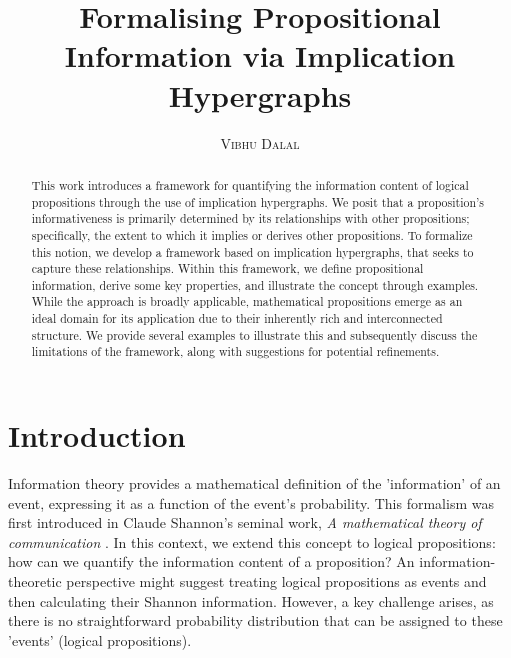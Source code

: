 \documentclass[11pt]{article}
\title{\textbf{Formalising Propositional Information via Implication Hypergraphs}}
\author{
    \textsc{Vibhu Dalal} \\[0.6em]
    {\small \text{Université Paris Cité}}
}
\date{} %
\theoremstyle{definition}
\theoremstyle{plain}
\theoremstyle{remark}
\begin{document}
\maketitle




\begin{abstract}
This work introduces a framework for quantifying the information content of logical propositions through the use of implication hypergraphs. We posit that a proposition's informativeness is primarily determined by its relationships with other propositions; specifically, the extent to which it implies or derives other propositions. To formalize this notion, we develop a framework based on implication hypergraphs, that seeks to capture these relationships. Within this framework, we define propositional information, derive some key properties, and illustrate the concept through examples. While the approach is broadly applicable, mathematical propositions emerge as an ideal domain for its application due to their inherently rich and interconnected structure. We provide several examples to illustrate this and subsequently discuss the limitations of the framework, along with suggestions for potential refinements.
\end{abstract}

\section{Introduction}

Information theory provides a mathematical definition of the 'information' of an event, expressing it as a function of the event's probability. This formalism was first introduced in Claude Shannon's seminal work, \emph{A mathematical theory of communication} \cite{https://doi.org/10.1002/j.1538-7305.1948.tb01338.x}. In this context, we extend this concept to logical propositions: how can we quantify the information content of a proposition? An information-theoretic perspective might suggest treating logical propositions as events and then calculating their Shannon information. However, a key challenge arises, as there is no straightforward probability distribution that can be assigned to these 'events' (logical propositions).
\end{document}
